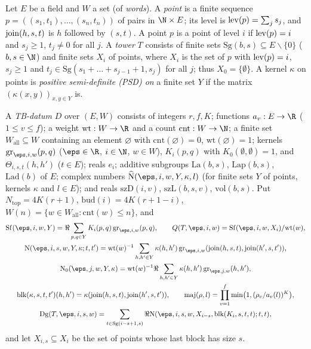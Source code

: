 \begin{definition}\label{pf:thmS:tbdata}
Let $E$ be a field and $W$ a set (of \emph{words}). A \emph{point} is a finite sequence
$p=((s_1,t_1),\dots,(s_n,t_n))$ of pairs in $\N\times E$; its level is $\operatorname{lev}(p)=\sum_js_j$, and
$\operatorname{join}(h,s,t)$ is $h$ followed by $(s,t)$. A point $p$ is a point of level $i$ if $\operatorname{lev}(p)=i$ and $s_j\ge1$,
$t_j\ne0$ for all $j$. A \emph{tower} $T$ consists of finite sets $\mathrm{Sg}(b,s)\subseteq E\smallsetminus\{0\}$
($b,s\in\N$) and finite sets $X_i$ of points, where $X_i$ is the set of $p$ with $\operatorname{lev}(p)=i$, $s_j\ge1$ and
$t_j\in\mathrm{Sg}(s_1+\dots+s_{j-1}+1,s_j)$ for all $j$; thus $X_0=\{\emptyset\}$. A kernel $\kappa$ on points is
\emph{positive semi-definite (PSD) on} a finite set $Y$ if the matrix $(\kappa(x,y))_{x,y\in Y}$ is.

A \emph{TB-datum} $D$ over $(E,W)$ consists of integers $r,f,K$; functions $a_v:E\to\R$ ($1\le v\le f$); a weight
$\mathrm{wt}:W\to\R$ and a count $\mathrm{cnt}:W\to\N$; a finite set $W_{\mathrm{all}}\subseteq W$ containing an
element $\varnothing$ with $\mathrm{cnt}(\varnothing)=0$, $\mathrm{wt}(\varnothing)=1$; kernels
$\thmSgram_{\eps,i,w}(p,q)$ ($\eps\in\R$, $i\in\N$, $w\in W$), $K_i(p,q)$ with $K_0(\emptyset,\emptyset)=1$, and
$\Theta_{i,s,t}(h,h')$ ($t\in E$); reals $e_i$; additive subgroups $\mathrm{La}(b,s)$, $\mathrm{Lap}(b,s)$,
$\mathrm{Lad}(b)$ of $E$; complex numbers $\thmSNh(\eps,i,w,Y,\kappa,l)$ (for finite sets $Y$ of points, kernels
$\kappa$ and $l\in E$); and reals $\mathrm{szD}(i,v)$, $\mathrm{szL}(b,s,v)$, $\mathrm{vol}(b,s)$. Put
$N_{\mathrm{top}}=4K(r+1)$, $\mathrm{bud}(i)=4K(r+1-i)$, $W(n)=\{w\in W_{\mathrm{all}}:\mathrm{cnt}(w)\le n\}$, and
\begin{gather*}
\thmSSf(\eps,i,w,Y)=\Re\sum_{p,q\in Y}K_i(p,q)\,\thmSgram_{\eps,i,w}(p,q),\qquad Q(T,\eps,i,w)=\thmSSf(\eps,i,w,X_i)/\mathrm{wt}(w),\\
\thmSNst(\eps,i,s,w,Y,\kappa;t,t')=\mathrm{wt}(w)^{-1}\sum_{h,h'\in Y}\kappa(h,h')\,
\thmSgram_{\eps,i,w}(\thmSjoin(h,s,t),\thmSjoin(h',s,t')),\\
\thmSNz(\eps,j,w,Y,\kappa)=\mathrm{wt}(w)^{-1}\Re\sum_{h,h'\in Y}\kappa(h,h')\,\thmSgram_{\eps,j,w}(h,h'),\\
\thmSblk(\kappa,s,t,t')(h,h')=\kappa(\thmSjoin(h,s,t),\thmSjoin(h',s,t')),\qquad
\thmSmaj(\rho,l)=\prod_{v=1}^f\min\bigl(1,(\rho_v/a_v(l))^K\bigr),\\
\thmSDg(T,\eps,i,s,w)=\sum_{t\in\mathrm{Sg}(i-s+1,s)}\Re\thmSNst(\eps,i,s,w,X_{i-s},\thmSblk(K_i,s,t,t);t,t),
\end{gather*}
and let $X_{i,s}\subseteq X_i$ be the set of points whose last block has size $s$.
\end{definition}

